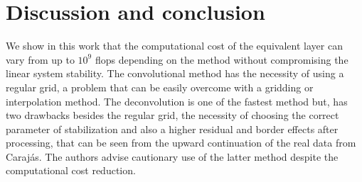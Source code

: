 \section{Discussion and conclusion}
We show in this work that the computational cost of the equivalent layer can vary from up to $10^9$ flops depending on the method without compromising the linear system stability. The convolutional method has the necessity of using a regular grid, a problem that can be easily overcome with a gridding or interpolation method. The deconvolution is one of the fastest method but, has two drawbacks besides the regular grid, the necessity of choosing the correct parameter of stabilization and also a higher residual and border effects after processing, that can be seen from the upward continuation of the real data from Carajás. The authors advise cautionary use of the latter method despite the computational cost reduction.